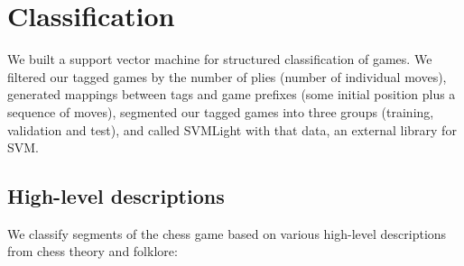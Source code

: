 \documentclass[11pt]{article}
\begin{document}
\section{Classification}
We built a support vector machine for structured classification of games. We filtered our tagged games by the number of plies (number of individual moves), generated mappings between tags and game prefixes (some initial position plus a sequence of moves), segmented our tagged games into three groups (training, validation and test), and called SVMLight with that data, an external library for SVM.

\subsection{High-level descriptions}
We classify segments of the chess game based on various high-level descriptions from chess theory and folklore:
\end{document}
